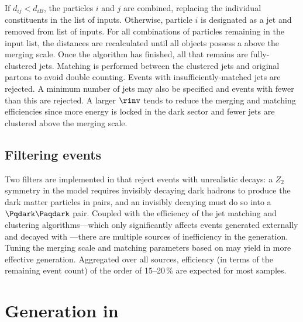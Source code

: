 If $d_{ij} < d_{iB}$, the particles $i$ and $j$ are combined, replacing the individual constituents in the list of inputs. Otherwise, particle $i$ is designated as a jet and removed from list of inputs. For all combinations of particles remaining in the input list, the distances are recalculated until all objects possess a \pt above the merging scale. Once the algorithm has finished, all that remains are fully-clustered \glspl{jet}. Matching is performed between the clustered \glspl{jet} and original partons to avoid double counting. Events with insufficiently-matched \glspl{jet} are rejected. A minimum number of \glspl{jet} may also be specified and events with fewer than this are rejected. A larger $\rinv$ tends to reduce the merging and matching efficiencies since more energy is locked in the dark sector and fewer \glspl{jet} are clustered above the merging scale.





\subsection{Filtering events}
\label{subsec:svj_pythia_filters}

Two filters are implemented in \PYTHIA that reject events with unrealistic decays: a $Z_2$ symmetry in the model requires invisibly decaying dark hadrons to produce the dark matter particles in pairs, and an invisibly decaying \PZprime must do so into a $\Pqdark\Paqdark$ pair. Coupled with the efficiency of the \gls{jet} matching and clustering algorithms---which only significantly affects events generated externally and decayed with \PYTHIA---there are multiple sources of inefficiency in the generation. Tuning the merging scale and matching parameters based on \rinv may yield in more effective generation. Aggregated over all sources, efficiency (in terms of the remaining event count) of the order of 15--20\,\% are expected for most \MADGRAPH samples.




\section{Generation in \texorpdfstring{\MADGRAPH}{MadGraph}}
\label{sec:svj_signal_madgraph}

